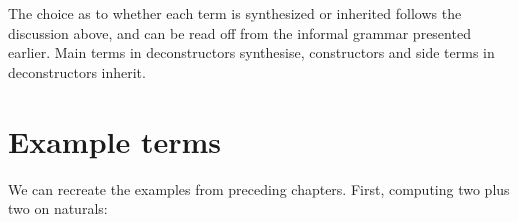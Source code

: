 \begin{fence}
\begin{code}
\AgdaSpace{}%
\AgdaSpace{}%
\AgdaSpace{}%
\AgdaSpace{}%
\AgdaSpace{}%
\AgdaSpace{}%
\AgdaSpace{}%
\AgdaSpace{}%
\<%
\\
%
\>[2]%
\>[27]\AgdaSymbol{:}\AgdaSpace{}%
\AgdaSpace{}%
\AgdaSpace{}%
\AgdaSpace{}%
\AgdaSpace{}%
\<%
\\
%
\>[2]%
\>[27]\AgdaSymbol{:}\AgdaSpace{}%
\AgdaSpace{}%
\AgdaSpace{}%
\<%
\end{code}
\end{fence}

The choice as to whether each term is synthesized or inherited follows
the discussion above, and can be read off from the informal grammar
presented earlier. Main terms in deconstructors synthesise, constructors
and side terms in deconstructors inherit.

\hypertarget{example-terms}{%
\section{Example terms}\label{example-terms}}

We can recreate the examples from preceding chapters. First, computing
two plus two on naturals:

